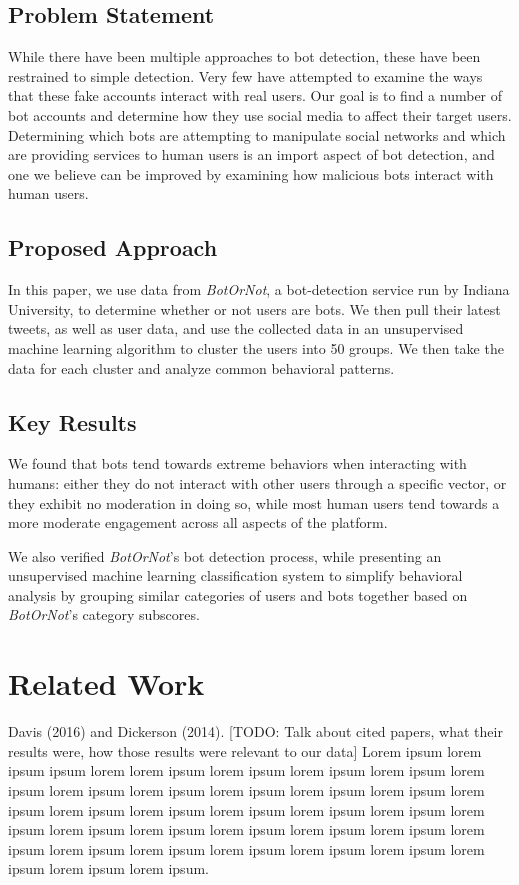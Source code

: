 \documentclass{sig-alternate-05-2015}
\begin{document}
\subsection{Problem Statement}
While there have been multiple approaches to bot detection\cite{Stringhini:DetectSpam}\cite{Xiao:ClusterFakeAccounts}\cite{Chu:DetectAutomation}, these have been restrained to simple detection. Very few have attempted to examine the ways that these fake accounts interact with real users. Our goal is to find a number of bot accounts and determine how they use social media to affect their target users. Determining which bots are attempting to manipulate social networks and which are providing services to human users is an import aspect of bot detection, and one we believe can be improved by examining how malicious bots interact with human users.

\subsection{Proposed Approach}
In this paper, we use data from \emph{BotOrNot}, a bot-detection service run by Indiana University, to determine whether or not users are bots. We then pull their latest tweets, as well as user data, and use the collected data in an unsupervised machine learning algorithm to cluster the users into 50 groups. We then take the data for each cluster and analyze common behavioral patterns.

\subsection{Key Results}
We found that bots tend towards extreme behaviors when interacting with humans: either they do not interact with other users through a specific vector, or they exhibit no moderation in doing so, while most human users tend towards a more moderate engagement across all aspects of the platform.

We also verified \emph{BotOrNot}'s bot detection process, while presenting an unsupervised machine learning classification system to simplify behavioral analysis by grouping similar categories of users and bots together based on \emph{BotOrNot}'s category subscores.

\section{Related Work}
Davis (2016)\cite{Davis:BotOrNot} and Dickerson (2014)\cite{Dickerson:Sentiment}. [TODO: Talk about cited papers, what their results were, how those results were relevant to our data] Lorem ipsum lorem ipsum ipsum lorem lorem ipsum lorem ipsum lorem ipsum lorem ipsum lorem ipsum lorem ipsum lorem ipsum lorem ipsum lorem ipsum lorem ipsum lorem ipsum lorem ipsum lorem ipsum lorem ipsum lorem ipsum lorem ipsum lorem ipsum lorem ipsum lorem ipsum lorem ipsum lorem ipsum lorem ipsum lorem ipsum lorem ipsum lorem ipsum lorem ipsum lorem ipsum lorem ipsum lorem ipsum lorem ipsum lorem ipsum.
\end{document}
